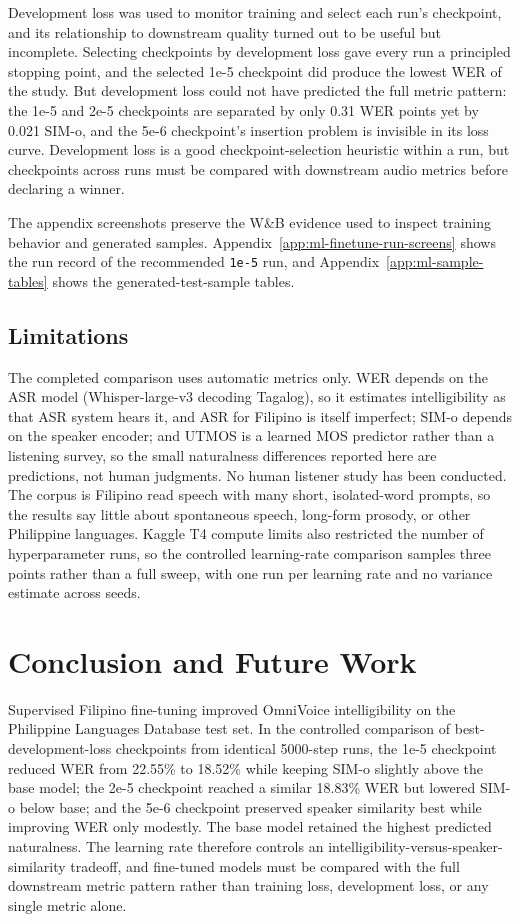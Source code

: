 \documentclass[11pt]{article}
\begin{document}
Development loss was used to monitor training and select each run's checkpoint, and its relationship to downstream quality turned out to be useful but incomplete. Selecting checkpoints by development loss gave every run a principled stopping point, and the selected 1e-5 checkpoint did produce the lowest WER of the study. But development loss could not have predicted the full metric pattern: the 1e-5 and 2e-5 checkpoints are separated by only 0.31 WER points yet by 0.021 SIM-o, and the 5e-6 checkpoint's insertion problem is invisible in its loss curve. Development loss is a good checkpoint-selection heuristic within a run, but checkpoints across runs must be compared with downstream audio metrics before declaring a winner.

The appendix screenshots preserve the W\&B evidence used to inspect training behavior and generated samples. Appendix~\ref{app:ml-finetune-run-screens} shows the run record of the recommended \texttt{1e-5} run, and Appendix~\ref{app:ml-sample-tables} shows the generated-test-sample tables.

\subsection{Limitations}

The completed comparison uses automatic metrics only. WER depends on the ASR model (Whisper-large-v3 decoding Tagalog), so it estimates intelligibility as that ASR system hears it, and ASR for Filipino is itself imperfect; SIM-o depends on the speaker encoder; and UTMOS is a learned MOS predictor rather than a listening survey, so the small naturalness differences reported here are predictions, not human judgments. No human listener study has been conducted. The corpus is Filipino read speech with many short, isolated-word prompts, so the results say little about spontaneous speech, long-form prosody, or other Philippine languages. Kaggle T4 compute limits also restricted the number of hyperparameter runs, so the controlled learning-rate comparison samples three points rather than a full sweep, with one run per learning rate and no variance estimate across seeds.

\section{Conclusion and Future Work}

Supervised Filipino fine-tuning improved OmniVoice intelligibility on the Philippine Languages Database test set. In the controlled comparison of best-development-loss checkpoints from identical 5000-step runs, the 1e-5 checkpoint reduced WER from 22.55\% to 18.52\% while keeping SIM-o slightly above the base model; the 2e-5 checkpoint reached a similar 18.83\% WER but lowered SIM-o below base; and the 5e-6 checkpoint preserved speaker similarity best while improving WER only modestly. The base model retained the highest predicted naturalness. The learning rate therefore controls an intelligibility-versus-speaker-similarity tradeoff, and fine-tuned models must be compared with the full downstream metric pattern rather than training loss, development loss, or any single metric alone.
\end{document}
